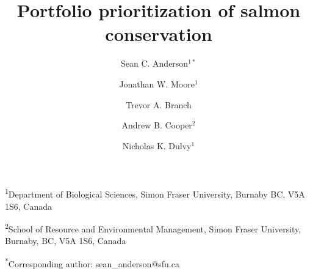 \documentclass[12pt]{article}
\title{Portfolio prioritization of salmon conservation }
\author{Sean C. Anderson$^{1*}$ \and Jonathan W. Moore$^1$ \and Trevor A. Branch
  \and Andrew B. Cooper$^2$ \and Nicholas K.  Dulvy$^1$}
\date{}
\begin{document}
\doublespacing
\maketitle

\noindent
  \textsuperscript{1}Department of Biological Sciences, Simon Fraser
  University, Burnaby BC, V5A 1S6, Canada

\noindent
	\textsuperscript{2}School of Resource and Environmental Management, Simon
  Fraser University, Burnaby, BC, V5A 1S6, Canada

\noindent
	\textsuperscript{*}Corresponding author: sean\_anderson@sfu.ca

\clearpage




\renewcommand{\thetable}{S\arabic{table}}
\setcounter{table}{0} %

\renewcommand{\thefigure}{S\arabic{figure}}
\renewcommand{\figurename}{Fig.}
\setcounter{figure}{0}  %


\end{document}
